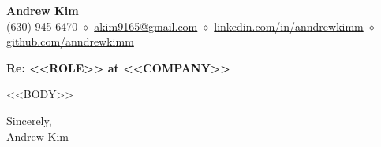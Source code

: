 \documentclass[11pt]{article}
\begin{document}
\begin{center}
{\Large\bfseries Andrew Kim}\\[3pt]
(630) 945-6470 $\diamond$
\href{mailto:akim9165@gmail.com}{akim9165@gmail.com} $\diamond$
\href{https://linkedin.com/in/anndrewkimm}{linkedin.com/in/anndrewkimm} $\diamond$
\href{https://github.com/anndrewkimm}{github.com/anndrewkimm}
\end{center}

\vspace{0.5em}
\textbf{Re: <<ROLE>> at <<COMPANY>>}

\vspace{0.5em}
<<BODY>>

\vfill
Sincerely,\\
Andrew Kim
\end{document}
